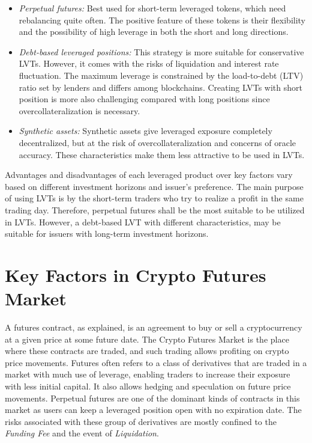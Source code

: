 \begin{itemize}
	\item \textit{Perpetual futures:} Best used for short-term leveraged tokens, which need rebalancing quite often. The positive feature of these tokens is their flexibility and the possibility of high leverage in both the short and long directions.
	
	\item \textit{Debt-based leveraged positions:} This strategy is more suitable for conservative LVTs. However, it comes with the risks of liquidation and interest rate fluctuation. The maximum leverage is constrained by the load-to-debt (LTV) ratio set by lenders and differs among blockchains. Creating LVTs with short position is more also challenging compared with long positions since overcollateralization is necessary.
	
	\item \textit{Synthetic assets:} Synthetic assets give leveraged exposure completely decentralized, but at the risk of overcollateralization and concerns of oracle accuracy. These characteristics make them less attractive to be used in LVTs.
\end{itemize}
Advantages and disadvantages of each leveraged product over key factors vary based on different investment horizons and issuer's preference. The main purpose of using LVTs is by the short-term traders who try to realize a profit in the same trading day. Therefore, perpetual futures shall be the most suitable to be utilized in LVTs. However, a debt-based LVT with different characteristics, may be suitable for issuers with long-term investment horizons.

\section{Key Factors in Crypto Futures Market}\label{appx:futures}
A futures contract, as explained, is an agreement to buy or sell a cryptocurrency at a given price at some future date. The Crypto Futures Market is the place where these contracts are traded, and such trading allows profiting on crypto price movements. Futures often refers to a class of derivatives that are traded in a market with much use of leverage, enabling traders to increase their exposure with less initial capital. It also allows hedging and speculation on future price movements. Perpetual futures are one of the dominant kinds of contracts in this market as users can keep a leveraged position open with no expiration date. The risks associated with these group of derivatives are mostly confined to the \textsl{Funding Fee} and the event of \textsl{Liquidation}.

